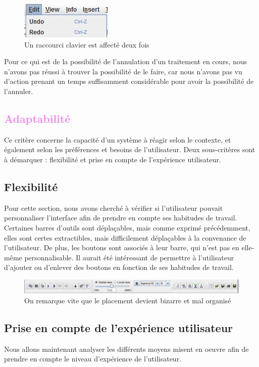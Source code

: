 \documentclass[12pt, a4paper]{article}
\begin{document}
\begin{figure}[h]
\begin{center}
   \includegraphics[scale = 0.8]{ctrlz.jpg}
	\caption{Un raccourci clavier est affecté deux fois}
	\end{center}
\end{figure}

Pour ce qui est de la possibilité de l'annulation d'un traitement en cours, nous n'avons pas réussi à trouver la possibilité de le faire, car nous n'avons pas vu d'action prenant un temps suffisamment considérable pour avoir la possibilité de l'annuler.

\textcolor{Violet}{\section{Adaptabilité}}
Ce critère concerne la capacité d'un système à réagir selon le contexte, et également selon les préférences et besoins de l'utilisateur. Deux sous-critères sont à démarquer : flexibilité et prise en compte de l'expérience utilisateur. 

\textcolor{NavyBlue}{\subsection{Flexibilité}}
Pour cette section, nous avons cherché à vérifier si l'utilisateur pouvait personnaliser l'interface afin de prendre en compte ses habitudes de travail. \\


Certaines barres d'outils sont déplaçables, mais comme exprimé précédemment, elles sont certes extractibles, mais difficilement déplaçables à la convenance de l'utilisateur. De plus, les boutons sont associés à leur barre, qui n'est pas en elle-même personnalisable. Il aurait été intéressant de permettre à l'utilisateur d'ajouter ou d'enlever des boutons en fonction de ses habitudes de travail.
\begin{figure}[h]
\begin{center}
   \includegraphics[scale = 0.5]{bazzare.jpg}
	\caption{On remarque vite que le placement devient bizarre et mal organisé}
	\end{center}
\end{figure}
\newpage
\textcolor{NavyBlue}{\subsection{Prise en compte de l'expérience utilisateur}}
Nous allons maintenant analyser les différents moyens misent en oeuvre afin de prendre en compte le niveau d'expérience de l'utilisateur.\\
\end{document}
